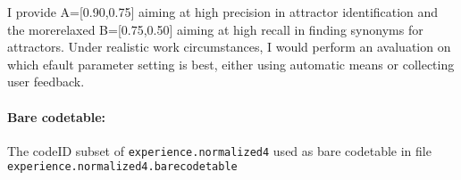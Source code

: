 \documentclass[12pt]{article}%
\begin{document}
 I provide A=[0.90,0.75] aiming at high precision in attractor identification and the morerelaxed B=[0.75,0.50] aiming at high recall in finding synonyms for attractors. Under realistic work circumstances, I would perform an avaluation on which efault parameter setting is best, either using automatic means or collecting user feedback.
 
\paragraph{Bare codetable:} The codeID subset of  \texttt{experience.normalized4} used as bare codetable in file \texttt{experience.normalized4.barecodetable}







%
%
%
\end{document}
